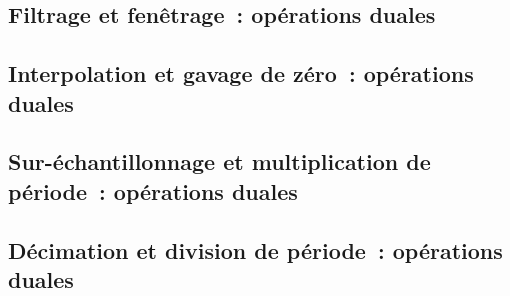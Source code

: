 \subsection{Filtrage et fenêtrage~: opérations duales}

\subsection{Interpolation et gavage de zéro~: opérations duales}

\subsection{Sur-échantillonnage et multiplication de période~: opérations duales}

\subsection{Décimation et division de période~: opérations duales}

